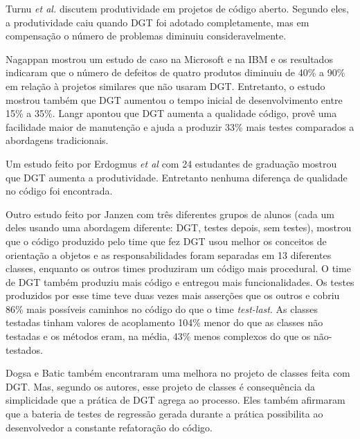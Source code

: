 Turnu \textit{et al.} \cite{turnu-tdd-opensouce} discutem produtividade em
projetos de código aberto. Segundo eles, a produtividade caiu quando DGT foi
adotado completamente, mas em compensação o número de problemas diminuiu 
consideravelmente.

Nagappan \cite{nagappan-ms} mostrou um estudo de caso na Microsoft e na IBM e os
resultados indicaram que o número de defeitos de quatro produtos diminuiu de 
40\% a 90\% em relação à projetos similares que não usaram DGT. Entretanto, o 
estudo mostrou também que DGT aumentou o tempo inicial de desenvolvimento entre 15\%
a 35\%. Langr \cite{langr} apontou que DGT aumenta a qualidade código, provê uma 
facilidade maior de manutenção e ajuda a produzir 33\% mais testes comparados  a
abordagens tradicionais.

Um estudo feito por Erdogmus \textit{et al} \cite{erdogmus-morisio} com 24 estudantes de
graduação mostrou que DGT aumenta a produtividade. Entretanto nenhuma diferença 
de qualidade no código foi encontrada.

Outro estudo feito por Janzen \cite{janzen-saiedian} com três diferentes grupos
de alunos (cada um deles usando uma abordagem diferente: DGT, testes depois, sem
testes), mostrou que o código produzido pelo time que fez DGT usou melhor os
conceitos de orientação a objetos e as responsabilidades foram separadas em 13 
diferentes classes, enquanto os outros times produziram um código mais
procedural. O time de DGT também produziu mais código e entregou mais
funcionalidades. Os testes produzidos por esse time teve duas vezes mais
asserções que os outros e cobriu 86\% mais possíveis caminhos no código 
do que o time \textit{test-last}. 
As classes testadas tinham valores de acoplamento 104\% menor do 
que as classes não testadas e os métodos eram, na média, 43\% menos complexos 
do que os não-testados.

Dogsa e Batic \cite{dogsa-batic} também encontraram uma melhora no
projeto de classes feita com DGT. Mas, segundo os autores, esse projeto de classes é 
consequência da simplicidade que a prática de DGT agrega ao processo. Eles
também  afirmaram que a bateria de testes de regressão gerada durante a prática 
possibilita ao desenvolvedor a constante refatoração do código.

